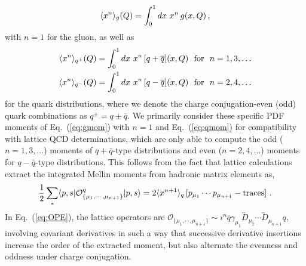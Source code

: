 \begin{equation}
\langle x^n\rangle_g(Q)=\int_{0}^{1}dx\ x^{n}\,  g(x,\Q) \, ,
\label{eq:gmom}
\end{equation}
with $n\!=\!1$ for the gluon, as well as
\begin{align}
	\langle x^n\rangle_{q^+}(Q) &= \int_{0}^{1}dx\ x^{n}\,  [q + \overline{q}](x,Q) \ \ \mathrm{for}\ \ n = 1, 3, \dots \nonumber \\
	\langle x^n\rangle_{q^-}(Q) &= \int_{0}^{1}dx\ x^{n}\,  [q - \overline{q}](x,Q) \ \ \mathrm{for}\ \ n = 2, 4, \dots
\label{eq:qmom}
\end{align}
for the quark distributions, where we denote the charge conjugation-even (odd) quark combinations as $q^\pm = q \pm \overline{q}$.	
We primarily consider these specific PDF moments of Eq.~(\ref{eq:gmom}) with $n\!=\!1$ and Eq.~(\ref{eq:qmom}) for compatibility with lattice QCD determinations,
which are only able to compute the odd ($n\! =\! 1, 3, \dots$) moments of $q\!+\!\bar{q}$-type distributions and even ($n\! =\! 2, 4, \dots$) moments
for $q\!-\!\bar{q}$-type distributions.
This follows from the fact that lattice calculations extract the integrated Mellin moments from hadronic matrix elements as,
\begin{equation}
	\frac{1}{2}\sum_{s}\langle p,s|\mathcal{O}_{\{\mu_{1},\cdots,\mu_{n+1}\}}^{q}|p,s\rangle = 2 \langle x^{n+1} \rangle_{q}\,[p_{\mu_{1}}\cdots p_{\mu_{n+1}}-{\rm traces}]\ .
\label{eq:OPE}
\end{equation}
In Eq.~(\ref{eq:OPE}), the lattice operators are
$\mathcal{O}_{\{\mu_{1},\cdots,\mu_{n+1}\}}\! \sim\! i^n \overline{q} \gamma_{\mu_1} \overleftrightarrow{D}_{\mu_2} \cdots \overleftrightarrow{D}_{\mu_{n+1}} q$, involving
covariant derivatives in such a way that successive derivative insertions increase the order of the extracted moment, but also alternate the evenness and oddness under charge conjugation.


